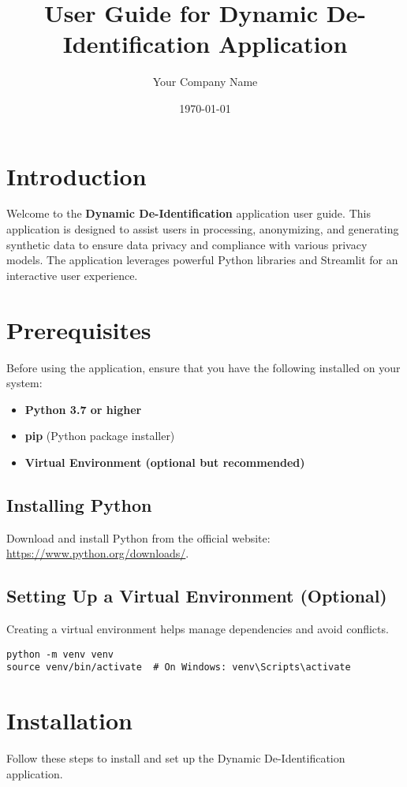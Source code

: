 \documentclass[12pt,a4paper]{article}
\title{User Guide for Dynamic De-Identification Application}
\author{Your Company Name}
\date{\today}
\begin{document}
\maketitle

\tableofcontents
\newpage

\section{Introduction}
Welcome to the \textbf{Dynamic De-Identification} application user guide. This application is designed to assist users in processing, anonymizing, and generating synthetic data to ensure data privacy and compliance with various privacy models. The application leverages powerful Python libraries and Streamlit for an interactive user experience.

\section{Prerequisites}
Before using the application, ensure that you have the following installed on your system:

\begin{itemize}
    \item \textbf{Python 3.7 or higher}
    \item \textbf{pip} (Python package installer)
    \item \textbf{Virtual Environment (optional but recommended)}
\end{itemize}

\subsection{Installing Python}
Download and install Python from the official website: \href{https://www.python.org/downloads/}{https://www.python.org/downloads/}.

\subsection{Setting Up a Virtual Environment (Optional)}
Creating a virtual environment helps manage dependencies and avoid conflicts.

\begin{verbatim}
python -m venv venv
source venv/bin/activate  # On Windows: venv\Scripts\activate
\end{verbatim}

\section{Installation}
Follow these steps to install and set up the Dynamic De-Identification application.
\end{document}
